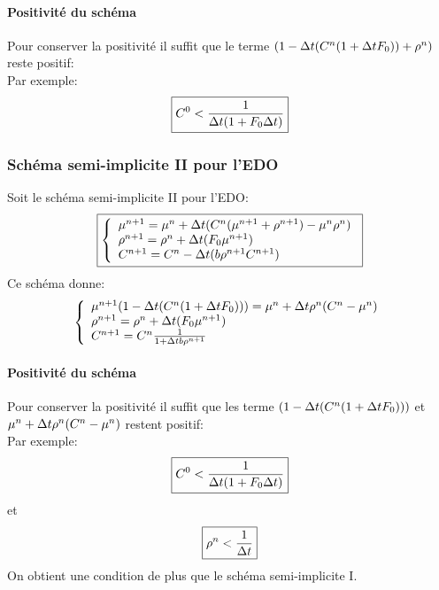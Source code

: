 \documentclass[11pt]{article}
\begin{document}
\paragraph{Positivité du schéma}
Pour conserver la positivité il suffit que le terme $(1-\Delta t(C^{n}(1+\Delta t F_0)) + \rho^{n}) $ reste positif:\\
Par exemple: 
\begin{equation}
	\boxed{C^0< \frac{1}{\Delta t(1+F_0\Delta t)}}
\end{equation}

\subsubsection{Schéma semi-implicite II pour l'EDO}
Soit le schéma semi-implicite II pour l'EDO:
\begin{equation} \boxed{\left\{
                \begin{array}{ll}
                   \mu^{n+1} = \mu^{n}+  \Delta t( C^{n}(\mu^{n+1} + \rho^{n+1}) -\mu^{n}\rho^{n})\\
                \rho^{n+1}=  \rho^{n}+ \Delta t (F_0 \mu^{n+1}) \\
                 C^{n+1} =C^{n}- \Delta t(b\rho^{n+1}C^{n+1})
                \end{array}
              \right.}
\end{equation}
Ce schéma donne:
\begin{equation*} \left\{
                \begin{array}{ll}
                   \mu^{n+1}(1-\Delta t(C^{n}(1+\Delta t F_0))) = \mu^{n}+  \Delta t \rho^{n}(C^{n}-\mu^{n}) \\
                \rho^{n+1}=  \rho^{n}+ \Delta t (F_0 \mu^{n+1}) \\
                 C^{n+1} =C^{n}\frac{1}{1+ \Delta t b\rho^{n+1}}
                \end{array}
              \right.
\end{equation*}
\paragraph{Positivité du schéma}
Pour conserver la positivité il suffit que les terme $(1-\Delta t(C^{n}(1+\Delta t F_0)))$ et $\mu^{n}+  \Delta t \rho^{n}(C^{n}-\mu^{n})$ restent positif:\\
Par exemple: 
\begin{equation}
	\boxed{C^0< \frac{1}{\Delta t(1+F_0\Delta t)}}
\end{equation}
et 
\begin{equation}
	\boxed{\rho^n< \frac{1}{\Delta t}}
\end{equation}
On obtient une condition de plus que le schéma semi-implicite I.
\end{document}
